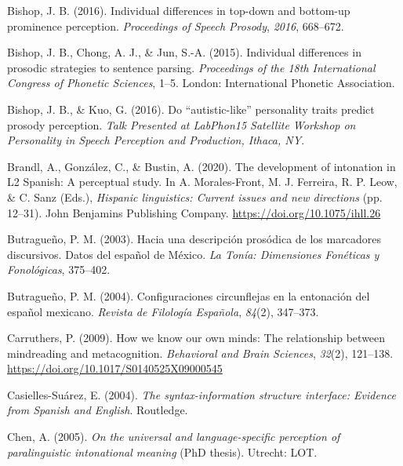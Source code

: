 \documentclass[]{article}
\newlength{\cslhangindent}
\newenvironment{CSLReferences}[2] %
 {%
  \setlength{\parindent}{0pt}
  \ifodd #1 \everypar{\setlength{\hangindent}{\cslhangindent}}\ignorespaces\fi
  \ifnum #2 > 0
  \setlength{\parskip}{#2\baselineskip}
  \fi
 }%
 {}
\begin{document}
\begin{CSLReferences}{1}{0}
\leavevmode{}%
Bishop, J. B. (2016). Individual differences in top-down and bottom-up prominence perception. \emph{Proceedings of Speech Prosody}, \emph{2016}, 668--672.

\leavevmode{}%
Bishop, J. B., Chong, A. J., \& Jun, S.-A. (2015). Individual differences in prosodic strategies to sentence parsing. \emph{Proceedings of the 18th International Congress of Phonetic Sciences}, 1--5. London: International Phonetic Association.

\leavevmode{}%
Bishop, J. B., \& Kuo, G. (2016). Do {``autistic-like''} personality traits predict prosody perception. \emph{Talk Presented at LabPhon15 Satellite Workshop on Personality in Speech Perception and Production, Ithaca, NY}.

\leavevmode{}%
Brandl, A., González, C., \& Bustin, A. (2020). The development of intonation in {L}2 {S}panish: {A} perceptual study. In A. Morales-Front, M. J. Ferreira, R. P. Leow, \& C. Sanz (Eds.), \emph{Hispanic linguistics: Current issues and new directions} (pp. 12--31). John Benjamins Publishing Company. \url{https://doi.org/10.1075/ihll.26}

\leavevmode{}%
Butragueño, P. M. (2003). Hacia una descripción prosódica de los marcadores discursivos. {D}atos del español de {M}éxico. \emph{La Tonía: Dimensiones Fonéticas y Fonológicas}, 375--402.

\leavevmode{}%
Butragueño, P. M. (2004). Configuraciones circunflejas en la entonación del español mexicano. \emph{{R}evista de {F}ilología {E}spañola}, \emph{84}(2), 347--373.

\leavevmode{}%
Carruthers, P. (2009). How we know our own minds: The relationship between mindreading and metacognition. \emph{Behavioral and Brain Sciences}, \emph{32}(2), 121--138. \url{https://doi.org/10.1017/S0140525X09000545}

\leavevmode{}%
Casielles-Suárez, E. (2004). \emph{The syntax-information structure interface: {E}vidence from {S}panish and {E}nglish}. Routledge.

\leavevmode{}%
Chen, A. (2005). \emph{On the universal and language-specific perception of paralinguistic intonational meaning} (PhD thesis). Utrecht: LOT.


\end{CSLReferences}
\end{document}
